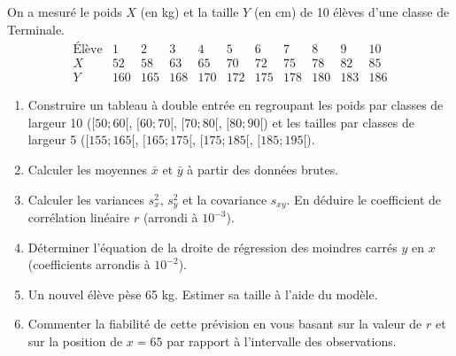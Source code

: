 \documentclass[11pt]{article}
\begin{document}
\begin{exercice}
On a mesuré le poids $X$ (en kg) et la taille $Y$ (en cm) de 10 élèves d'une classe de Terminale.
\[
\begin{array}{c|cccccccccc}
\text{Élève} & 1 & 2 & 3 & 4 & 5 & 6 & 7 & 8 & 9 & 10 \\ \hline
X & 52 & 58 & 63 & 65 & 70 & 72 & 75 & 78 & 82 & 85 \\
Y & 160 & 165 & 168 & 170 & 172 & 175 & 178 & 180 & 183 & 186
\end{array}
\]
\begin{enumerate}
\item Construire un tableau à double entrée en regroupant les poids par classes de largeur 10 ($[50;60[$, $[60;70[$, $[70;80[$, $[80;90[$) et les tailles par classes de largeur 5 ($[155;165[$, $[165;175[$, $[175;185[$, $[185;195[$).
\item Calculer les moyennes $\bar{x}$ et $\bar{y}$ à partir des données brutes.
\item Calculer les variances $s_x^2$, $s_y^2$ et la covariance $s_{xy}$. En déduire le coefficient de corrélation linéaire $r$ (arrondi à $10^{-3}$).
\item Déterminer l'équation de la droite de régression des moindres carrés $y$ en $x$ (coefficients arrondis à $10^{-2}$).
\item Un nouvel élève pèse 65 kg. Estimer sa taille à l'aide du modèle.
\item Commenter la fiabilité de cette prévision en vous basant sur la valeur de $r$ et sur la position de $x=65$ par rapport à l'intervalle des observations.
\end{enumerate}
\end{exercice}
\end{document}
